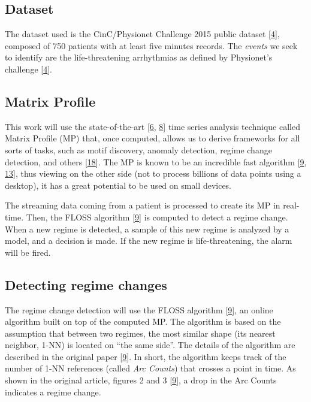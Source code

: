 \documentclass[runningheads]{llncs}
\begin{document}
\hypertarget{dataset}{%
\subsection{Dataset}\label{dataset}}

The dataset used is the CinC/Physionet Challenge 2015 public dataset {[}\protect\hyperlink{ref-Clifford2015}{4}{]}, composed of
750 patients with at least five minutes records. The \emph{events} we seek to identify are the
life-threatening arrhythmias as defined by Physionet's challenge {[}\protect\hyperlink{ref-Clifford2015}{4}{]}.

\hypertarget{matrix-profile}{%
\subsection{Matrix Profile}\label{matrix-profile}}

This work will use the state-of-the-art {[}\protect\hyperlink{ref-DePaepe2020}{6}, \protect\hyperlink{ref-Feremans2020}{8}{]} time series analysis technique
called Matrix Profile (MP) that, once computed, allows us to derive frameworks for all sorts of
tasks, such as motif discovery, anomaly detection, regime change detection, and others {[}\protect\hyperlink{ref-Yeh2017a}{18}{]}.
The MP is known to be an incredible fast algorithm {[}\protect\hyperlink{ref-gharghabi2018}{9}, \protect\hyperlink{ref-Madrid2019}{13}{]}, thus viewing on
the other side (not to process billions of data points using a desktop), it has a great potential to
be used on small devices.

The streaming data coming from a patient is processed to create its MP in real-time. Then, the
FLOSS algorithm {[}\protect\hyperlink{ref-gharghabi2018}{9}{]} is computed to detect a regime change. When a new regime is
detected, a sample of this new regime is analyzed by a model, and a decision is made. If the new
regime is life-threatening, the alarm will be fired.

\hypertarget{detecting-regime-changes}{%
\subsection{Detecting regime changes}\label{detecting-regime-changes}}

The regime change detection will use the FLOSS algorithm {[}\protect\hyperlink{ref-gharghabi2018}{9}{]}, an online algorithm built
on top of the computed MP. The algorithm is based on the assumption that between two regimes, the
most similar shape (its nearest neighbor, 1-NN) is located on ``the same side''. The details of the
algorithm are described in the original paper {[}\protect\hyperlink{ref-gharghabi2018}{9}{]}. In short, the algorithm keeps track
of the number of 1-NN references (called \emph{Arc Counts}) that crosses a point in time. As shown in
the original article, figures 2 and 3 {[}\protect\hyperlink{ref-gharghabi2018}{9}{]}, a drop in the Arc Counts indicates a regime
change.
\end{document}
